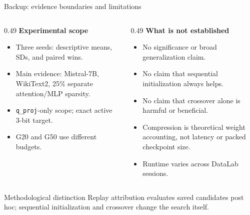 \documentclass[aspectratio=169,10pt]{beamer}
\newcommand{\tightitems}{\setlength{\itemsep}{0.25em}\setlength{\parskip}{0pt}}
\begin{document}
\begin{frame}{Backup: evidence boundaries and limitations}
\small
\begin{columns}[T,onlytextwidth]
\begin{column}{0.49\textwidth}
\textbf{Experimental scope}
\begin{itemize}\tightitems
  \item Three seeds: descriptive means, SDs, and paired wins.
  \item Main evidence: Mistral-7B, WikiText2, 25\% separate attention/MLP sparsity.
  \item \texttt{q\_proj}-only scope; exact active 3-bit target.
  \item G20 and G50 use different budgets.
\end{itemize}
\end{column}
\begin{column}{0.49\textwidth}
\textbf{What is not established}
\begin{itemize}\tightitems
  \item No significance or broad generalization claim.
  \item No claim that sequential initialization always helps.
  \item No claim that crossover alone is harmful or beneficial.
  \item Compression is theoretical weight accounting, not latency or packed checkpoint size.
  \item Runtime varies across DataLab sessions.
\end{itemize}
\end{column}
\end{columns}

\vspace{0.18cm}
\begin{block}{Methodological distinction}
Replay attribution evaluates saved candidates post hoc; sequential initialization and crossover change the search itself.
\end{block}
\end{frame}
\end{document}
